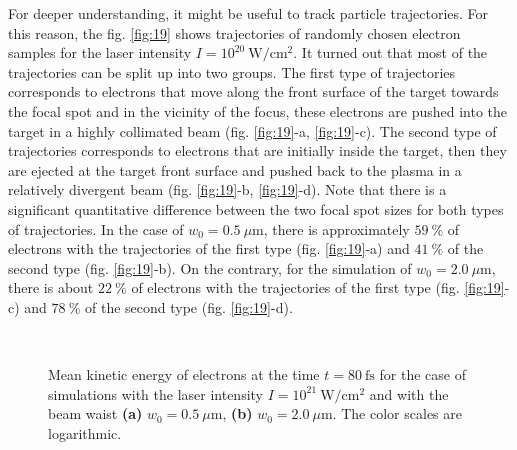 For deeper understanding, it might be useful to track particle trajectories. For this reason, the fig. \ref{fig:19} shows trajectories of randomly chosen electron samples for the laser intensity $ I = 10^{20} \ \mathrm{W/cm^2} $. It turned out that most of the trajectories can be split up into two groups. The first type of trajectories corresponds to electrons that move along the front surface of the target towards the focal spot and in the vicinity of the focus, these electrons are pushed into the target in a highly collimated beam (fig. \ref{fig:19}-a, \ref{fig:19}-c). The second type of trajectories corresponds to electrons that are initially inside the target, then they are ejected at the target front surface and pushed back to the plasma in a relatively divergent beam (fig. \ref{fig:19}-b, \ref{fig:19}-d). Note that there is a significant quantitative difference between the two focal spot sizes for both types of trajectories. In the case of $ w_0 = 0.5 \ \mu\mathrm{m} $, there is approximately $ 59 \ \% $ of electrons with the trajectories of the first type (fig. \ref{fig:19}-a) and $ 41 \ \% $ of the second type (fig. \ref{fig:19}-b). On the contrary, for the simulation of $ w_0 = 2.0 \ \mu\mathrm{m} $, there is about $ 22 \ \% $ of electrons with the trajectories of the first type (fig. \ref{fig:19}-c) and $ 78 \ \% $ of the second type (fig. \ref{fig:19}-d).

\begin{figure}[h!]
	\centering
	\\[2mm]
	\caption{Mean kinetic energy of electrons at the time $ t = 80 \ \mathrm{fs} $ for the case of simulations with the laser intensity $ I = 10^{21} \ \mathrm{W/cm^2} $ and with the beam waist \textbf{(a)} $ w_0 = 0.5 \ \mu\mathrm{m} $, \textbf{(b)} $ w_0 = 2.0 \ \mu\mathrm{m} $. The color scales are logarithmic.}
	\label{fig:17}
\end{figure}

